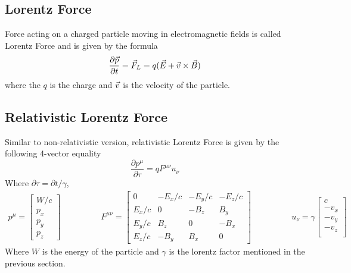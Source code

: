 \documentclass[a4paper,oneside,12pt]{report}
\numberwithin{equation}{chapter}
\begin{document}
\subsection{Lorentz Force} \label{sec:lorentz-force}
Force acting on a charged particle moving in electromagnetic fields is called Lorentz Force and is given by the formula
\newline
\begin{equation} \label{eq:lf}
    \frac{\partial \vec{p}}{\partial t} = \vec{F}_L=q(\vec{E}+ \vec{v} \times \vec{B})
\end{equation}
\newline
where the $q$ is the charge and $\vec{v}$ is the velocity of the particle. 

\subsection{Relativistic Lorentz Force}
Similar to non-relativistic version, relativistic Lorentz Force is given by the following 4-vector equality
\begin{equation}
    \frac{\partial p^{\mu}}{\partial \tau} = q F^{\mu \nu} u_{\nu}
\end{equation}
Where $ \partial \tau = \partial t / \gamma $,
\begin{equation}
    \begin{aligned}
        p^{\mu} = 
        \begin{bmatrix}
            W/c \\
            p_x         \\
            p_y \\
            p_z
        \end{bmatrix}    
    \end{aligned}
    \qquad\qquad
    \begin{aligned}
        F^{\mu\nu} = 
        \begin{bmatrix}
                0       & -E_x/c   & -E_y/c    & -E_z/c \\
                E_x/c   &   0      & -B_z      & B_y     \\
                E_y/c   &   B_z    &  0        & -B_x     \\
                E_z/c   &   -B_y   & B_x       & 0   
        \end{bmatrix} 
    \end{aligned}
    \qquad\qquad
    \begin{aligned}
        u_{\nu} = \gamma
        \begin{bmatrix}
                 c \\
                -v_x \\
                -v_y \\
                -v_z \\
        \end{bmatrix} 
    \end{aligned}
\end{equation}
Where $W$ is the energy of the particle and $\gamma$ is the lorentz factor mentioned in the previous section.
\newline
\end{document}
